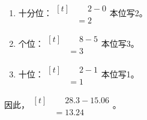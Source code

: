 {\begin{enumerate}[leftmargin=1.7em,itemsep=5pt,topsep=0pt]
\item 十分位：\(\begin{aligned}[t]&\phantom{={}}2-0\\&=2\end{aligned}\)\quad 本位写2。
\item 个位：\(\begin{aligned}[t]&\phantom{={}}8-5\\&=3\end{aligned}\)\quad 本位写3。
\item 十位：\(\begin{aligned}[t]&\phantom{={}}2-1\\&=1\end{aligned}\)\quad 本位写1。
\end{enumerate}
\par\smallskip
因此，\(\begin{aligned}[t]&\phantom{={}}28.3-15.06\\&=13.24\end{aligned}\)。
\par\medskip

}

